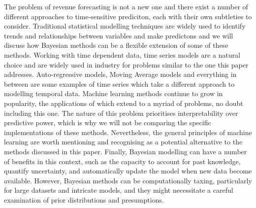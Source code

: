The problem of revenue forecasting is not a new one and there exist a number of
different approaches to time-sensitive prediciton, each with their own
subtleties to consider.
Traditional statistical modelling techniques are widely used to identify trends
and relationships between variables and make predictons and we will discuss how
Bayesian methods can be a flexible extension of some of these methods. 
Working with time dependent data, time series models are a natural choice and
are widely used in industry for problems similar to the one this paper
addresses. Auto-regressive models, Moving Average models and everything in
between are some examples of time series which take a different approach to
modelling temporal data.
Machine learning methods continue to grow in popularity, the applications of
which extend to a myriad of problems, no doubt including this one. The nature
of this problem prioritises interpretability over predictive power, which is
why we will not be comparing the specific implementations of these methods.
Nevertheless, the general principles of machine learning are worth mentioning
and recognising as a potential alternative to the methods discussed in this
paper.
Finally, Bayesian modelling can have a number of benefits in this context, such
as the capacity to account for past knowledge, quantify uncertainty, and
automatically update the model when new data become available. However,
Bayesian methods can be computationally taxing, particularly for large datasets
and intricate models, and they might necessitate a careful examination of prior
distributions and presumptions.


